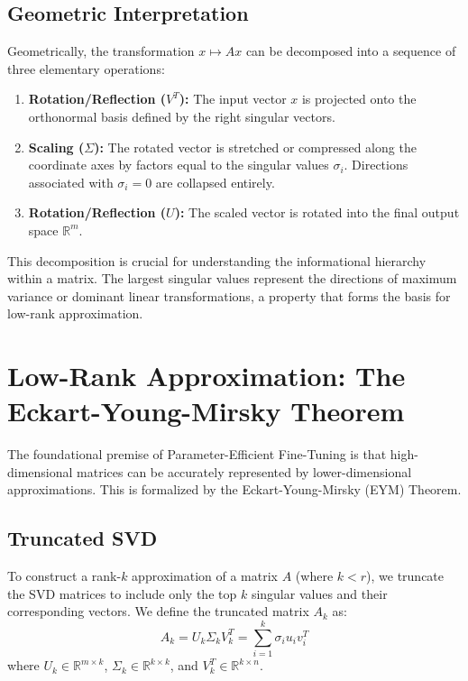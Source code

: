 \documentclass[11pt,journal,onecolumn]{IEEEtran}
\begin{document}
\subsection{Geometric Interpretation}
Geometrically, the transformation $x \mapsto Ax$ can be decomposed into a sequence of three elementary operations:
\begin{enumerate}
    \item \textbf{Rotation/Reflection ($V^T$):} The input vector $x$ is projected onto the orthonormal basis defined by the right singular vectors.
    \item \textbf{Scaling ($\Sigma$):} The rotated vector is stretched or compressed along the coordinate axes by factors equal to the singular values $\sigma_i$. Directions associated with $\sigma_i = 0$ are collapsed entirely.
    \item \textbf{Rotation/Reflection ($U$):} The scaled vector is rotated into the final output space $\mathbb{R}^m$.
\end{enumerate}

This decomposition is crucial for understanding the informational hierarchy within a matrix. The largest singular values represent the directions of maximum variance or dominant linear transformations, a property that forms the basis for low-rank approximation.






\section{Low-Rank Approximation: The Eckart-Young-Mirsky Theorem}
\label{sec:eym}

The foundational premise of Parameter-Efficient Fine-Tuning is that high-dimensional matrices can be accurately represented by lower-dimensional approximations. This is formalized by the Eckart-Young-Mirsky (EYM) Theorem.

\subsection{Truncated SVD}
To construct a rank-$k$ approximation of a matrix $A$ (where $k < r$), we truncate the SVD matrices to include only the top $k$ singular values and their corresponding vectors. We define the truncated matrix $A_k$ as:
\begin{equation}
    A_k = U_k \Sigma_k V_k^T = \sum_{i=1}^{k} \sigma_i u_i v_i^T
\end{equation}
where $U_k \in \mathbb{R}^{m \times k}$, $\Sigma_k \in \mathbb{R}^{k \times k}$, and $V_k^T \in \mathbb{R}^{k \times n}$.
\end{document}
